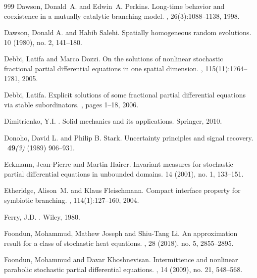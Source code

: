\documentclass[a4paper,12pt]{article}
\theoremstyle{plain}
\theoremstyle{definition}
\begin{document}
\begin{thebibliography}{999}
Dawson, Donald~A. and Edwin~A. Perkins.
\newblock Long-time behavior and coexistence in a mutually catalytic branching model.
, 26(3):1088--1138, 1998.

Dawson, Donald A. and Habib Salehi.
\newblock Spatially homogeneous random evolutions. 
 10 (1980), no. 2, 141--180. 

Debbi, Latifa and Marco Dozzi.
\newblock On the solutions of nonlinear stochastic fractional partial
  differential equations in one spatial dimension.
,
  115(11):1764--1781, 2005.



Debbi, Latifa.
\newblock Explicit solutions of some fractional partial differential equations via stable subordinators.
, pages 1--18, 2006.

Dimitrienko, Y.I.
.
\newblock Solid mechanics and its applications. Springer, 2010.

Donoho, David L. and Philip B. Stark.
\newblock Uncertainty principles and signal recovery.
\ {\bf 49}{\it (3)} (1989) 906--931.

Eckmann,  Jean-Pierre and Martin Hairer.
\newblock Invariant measures for stochastic partial differential equations in unbounded domains. 
 14 (2001), no. 1, 133--151. 

Etheridge, Alison~M. and Klaus Fleischmann.
\newblock Compact interface property for symbiotic branching.
, 114(1):127--160, 2004.

Ferry, J.D.
.
\newblock Wiley, 1980.


Foondun, Mohammud, Mathew Joseph and Shiu-Tang Li.
\newblock An approximation result for a class of stochastic heat equations.
, 28 (2018), no. 5, 2855--2895.


Foondun, Mohammud and Davar Khoshnevisan.
\newblock Intermittence and nonlinear parabolic stochastic partial differential equations.
, 14 (2009), no. 21, 548--568. 


\end{thebibliography}
\end{document}
